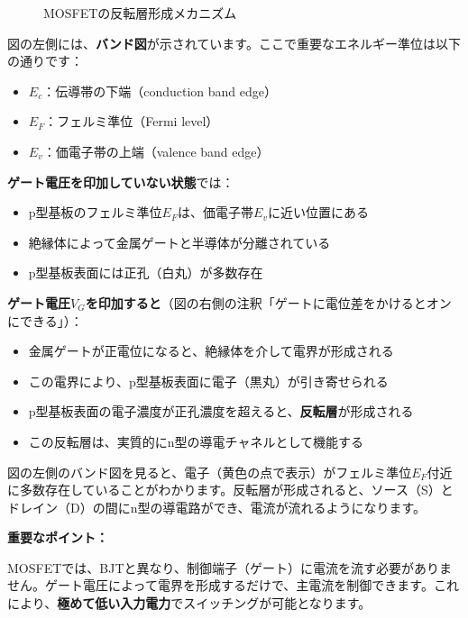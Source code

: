\begin{figure}[H]
\centering
{}
\caption{MOSFETの反転層形成メカニズム}
\label{fig:mosfet_inversion}
\end{figure}

図の左側には、\textbf{バンド図}が示されています。ここで重要なエネルギー準位は以下の通りです：

\begin{itemize}
\item $E_c$：伝導帯の下端（conduction band edge）
\item $E_F$：フェルミ準位（Fermi level）
\item $E_v$：価電子帯の上端（valence band edge）
\end{itemize}

\textbf{ゲート電圧を印加していない状態}では：

\begin{itemize}
\item p型基板のフェルミ準位$E_F$は、価電子帯$E_v$に近い位置にある
\item 絶縁体によって金属ゲートと半導体が分離されている
\item p型基板表面には正孔（白丸）が多数存在
\end{itemize}

\textbf{ゲート電圧$V_G$を印加すると}（図の右側の注釈「ゲートに電位差をかけるとオンにできる」）：

\begin{itemize}
\item 金属ゲートが正電位になると、絶縁体を介して電界が形成される
\item この電界により、p型基板表面に電子（黒丸）が引き寄せられる
\item p型基板表面の電子濃度が正孔濃度を超えると、\textbf{反転層}が形成される
\item この反転層は、実質的にn型の導電チャネルとして機能する
\end{itemize}

図の左側のバンド図を見ると、電子（黄色の点で表示）がフェルミ準位$E_F$付近に多数存在していることがわかります。反転層が形成されると、ソース（S）とドレイン（D）の間にn型の導電路ができ、電流が流れるようになります。

\textbf{重要なポイント：}

MOSFETでは、BJTと異なり、制御端子（ゲート）に電流を流す必要がありません。ゲート電圧によって電界を形成するだけで、主電流を制御できます。これにより、\textbf{極めて低い入力電力}でスイッチングが可能となります。

